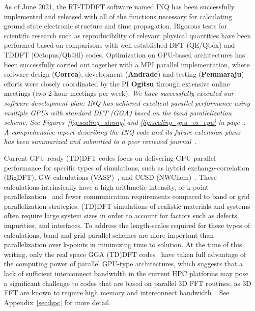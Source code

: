 As of June 2021, the RT-TDDFT software named INQ has been successfully implemented and released with all of the functions necessary for calculating ground state electronic structure and time propagation. Rigorous tests for scientific research such as reproducibility of relevant physical quantities have been performed based on comparisons with well established DFT (QE/Qbox) and TDDFT (Octopus/Qb@ll) codes. Optimization on GPU-based architectures has been successfully carried out together with a MPI parallel implementation, where software design ({\bf Correa}), development ({\bf Andrade}) and testing ({\bf Pemmaraju}) efforts were closely coordinated by the PI {\bf Ogitsu} through extensive online meetings (two 2-hour meetings per week). \emph{ We have successfully executed our software development plan: INQ has achieved excellent parallel performance using multiple GPUs with standard DFT (GGA) based on the band parallelization scheme. See Figures~\ref{fig:scaling_strong} and \ref{fig:scaling_gpu_vs_cpu} in page~\pageref{fig:scaling_strong}. A comprehensive report describing the INQ code and its future extension plans has been summarized and submitted to a peer reviewed journal~\cite{andrade2021inq}.} 

Current GPU-ready (TD)DFT codes focus on delivering GPU parallel performance for specific types of simulations, such as hybrid exchange-correlation (BigDFT)\cite{BigDFT2018},  GW calculations (VASP)~\cite{vasp2012,vasp2012b,vasp2018,vasp2019}, and CCSD (NWChem)~\cite{NWChem2013}. These calculations intrinsically have a high arithmetic intensity, or k-point parallelization~\cite{QE2017,QE2020} and fewer communication requirements compared to band or grid parallelization strategies. (TD)DFT simulations of realistic materials and systems often require large system sizes in order to account for factors such as defects, impurities, and interfaces. To address the length-scales required for these types of calculations, band and grid parallel schemes are more important than parallelization over k-points in minimizing time to solution. At the time of this writing, only the real space GGA (TD)DFT codes~\cite{andrade2012time,andrade2013real,SparcX2021} have taken full advantage of the computing power of parallel GPU-type architectures, which suggests that a lack of sufficient interconnect bandwidth in the current HPC platforms may pose a significant challenge to codes that are based on parallel 3D FFT routines, as 3D FFT are known to require high memory and interconnect bandwidth~\cite{heFFTe2020}. See Appendix~\ref{sec:hpc} for more detail.

